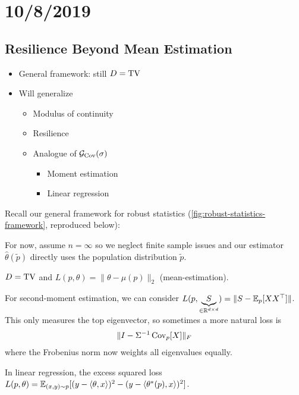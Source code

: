\section{10/8/2019}

\subsection{Resilience Beyond Mean Estimation}

\begin{itemize}
  \item General framework: still $D = \operatorname{TV}$
  \item Will generalize
    \begin{itemize}
      \item Modulus of continuity
      \item Resilience
      \item Analogue of $\mathcal{G}_{\operatorname{Cov}}(\sigma)$
        \begin{itemize}
          \item Moment estimation
          \item Linear regression
        \end{itemize}
    \end{itemize}
\end{itemize}

Recall our general framework for robust statistics
(\cref{fig:robust-statistics-framework}, reproduced below):
\begin{figure}[H]
    \centerline{
    }
\end{figure}

For now, assume $n = \infty$ so we neglect finite sample issues
and our estimator $\hat\theta(\tilde{p})$ directly uses the population
distribution $\tilde{p}$.

\begin{example}
  $D = \operatorname{TV}$ and $L(p, \theta) = \|\theta - \mu(p)\|_2$ (mean-estimation).

  For second-moment estimation, we can consider
  $L(p, \underbrace{S}_{\in \mathbb{R}^{d \times d}}) = \|S - \mathbb{E}_p[X X^\top] \|$.
  This only measures the top eigenvector, so sometimes a more natural loss is
  \begin{align}
    \|I - \Sigma^{-1} \operatorname{Cov}_p[X]\|_F
  \end{align}
  where the Frobenius norm now weights all eigenvalues equally.

  In linear regression, the excess squared loss
  $L(p, \theta) = \mathbb{E}_{(x,y) \sim p}[(y - \braket{\theta, x})^2 - (y - \braket{\theta^*(p), x})^2]$.
\end{example}

